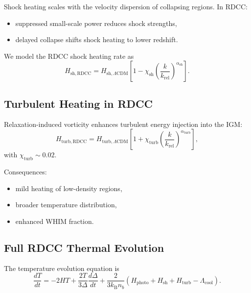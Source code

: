 \documentclass[11pt,a4paper]{article}
\begin{document}
Shock heating scales with the velocity dispersion of collapsing regions. In RDCC:
\begin{itemize}
\item suppressed small-scale power reduces shock strengths,
\item delayed collapse shifts shock heating to lower redshift.
\end{itemize}

We model the RDCC shock heating rate as
\begin{equation}
H_{\mathrm{sh,RDCC}}
=
H_{\mathrm{sh},\Lambda\mathrm{CDM}}
\left[
1
-
\chi_{\mathrm{sh}}
\left(
\frac{k}{k_{\mathrm{rel}}}
\right)^{\alpha_{\mathrm{sh}}}
\right].
\end{equation}

\subsection{Turbulent Heating in RDCC}

Relaxation-induced vorticity enhances turbulent energy injection into the IGM:
\begin{equation}
H_{\mathrm{turb,RDCC}}
=
H_{\mathrm{turb},\Lambda\mathrm{CDM}}
\left[
1
+
\chi_{\mathrm{turb}}
\left(
\frac{k}{k_{\mathrm{rel}}}
\right)^{\alpha_{\mathrm{turb}}}
\right],
\end{equation}
with $\chi_{\mathrm{turb}} \sim 0.02$.

Consequences:
\begin{itemize}
\item mild heating of low-density regions,
\item broader temperature distribution,
\item enhanced WHIM fraction.
\end{itemize}

\subsection{Full RDCC Thermal Evolution}

The temperature evolution equation is
\begin{equation}
\frac{dT}{dt}
=
-2HT
+
\frac{2T}{3\Delta}
\frac{d\Delta}{dt}
+
\frac{2}{3k_{\mathrm{B}}n_{b}}
\left(
H_{\mathrm{photo}}
+
H_{\mathrm{sh}}
+
H_{\mathrm{turb}}
-
\Lambda_{\mathrm{cool}}
\right).
\end{equation}
\end{document}
